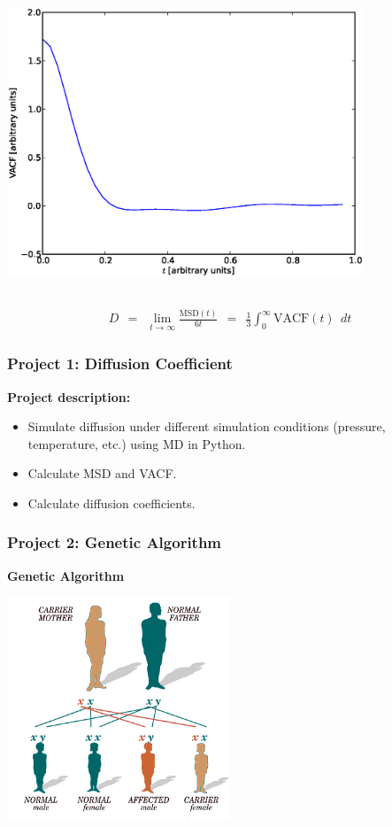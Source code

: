 \documentclass{beamer}
\begin{document}
{\begin{columns}[c]
        \includegraphics[width=0.8\textwidth]{images/diffusion_vacf.eps}

    \end{columns}

    \begin{align*}
        D \ \ = \ \ \lim_{t\rightarrow \infty} \frac{\mathrm{MSD}(t)}{6t}
          \ \ = \ \ \frac{1}{3} \int_0^\infty \mathrm{VACF}(t) \ \ dt
    \end{align*}

}


\frame
{
  \frametitle{Project 1: Diffusion Coefficient}
  {\bf Project description:}

  \smallskip

  \begin{itemize}
    \item Simulate diffusion under different simulation conditions
            (pressure, temperature, etc.) using MD in Python.
    \vspace{0.2in}
    \item Calculate MSD and VACF.
    \vspace{0.2in}
    \item Calculate diffusion coefficients.
  \end{itemize}

}


\frame
{
    \frametitle{Project 2: Genetic Algorithm}

    \centering
    {\bf Genetic Algorithm}

    \begin{center}
        \includegraphics[width=0.5\textwidth]{images/genetics_family.png}
    \end{center}
}
\end{document}

